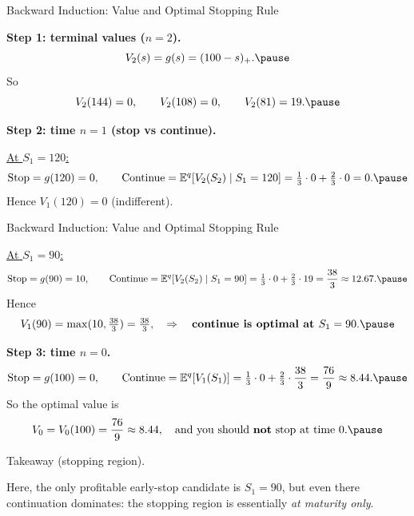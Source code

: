 \documentclass[aspectratio=169]{beamer}
\begin{document}
\begin{frame}{Backward Induction: Value and Optimal Stopping Rule}

\textbf{Step 1: terminal values ($n=2$).}
\[
V_2(s)=g(s)=(100-s)_+.\pause
\]
So
\[
V_2(144)=0,\qquad V_2(108)=0,\qquad V_2(81)=19.\pause
\]

\medskip

\textbf{Step 2: time $n=1$ (stop vs continue).}

\smallskip
\underline{At $S_1=120$:}
\[
\text{Stop}=g(120)=0,\qquad
\text{Continue}=\mathbb{E}^q[V_2(S_2)\mid S_1=120]=\tfrac13\cdot0+\tfrac23\cdot0=0.\pause
\]
Hence $V_1(120)=0$ (indifferent).
\end{frame}


\begin{frame}{Backward Induction: Value and Optimal Stopping Rule}

\underline{At $S_1=90$:}
\[
\text{Stop}=g(90)=10,\qquad
\text{Continue}=\mathbb{E}^q[V_2(S_2)\mid S_1=90]
=\tfrac13\cdot 0+\tfrac23\cdot 19=\frac{38}{3}\approx 12.67.\pause
\]
Hence
\[
V_1(90)=\max(10,\tfrac{38}{3})=\tfrac{38}{3},
\quad\Rightarrow\quad
\textbf{continue is optimal at } S_1=90.\pause
\]

\medskip

\textbf{Step 3: time $n=0$.}
\[
\text{Stop}=g(100)=0,
\qquad
\text{Continue}=\mathbb{E}^q[V_1(S_1)]
=\tfrac13\cdot 0+\tfrac23\cdot \frac{38}{3}
=\frac{76}{9}\approx 8.44.\pause
\]
So the optimal value is
\[
V_0=V_0(100)=\frac{76}{9}\approx 8.44,
\quad\text{and you should \textbf{not} stop at time }0.\pause
\]

\end{frame}

\begin{frame}{Takeaway (stopping region).}

Here, the only profitable early-stop candidate is $S_1=90$, but even there
continuation dominates: the stopping region is essentially \emph{at maturity only}.

\end{frame}
\end{document}
